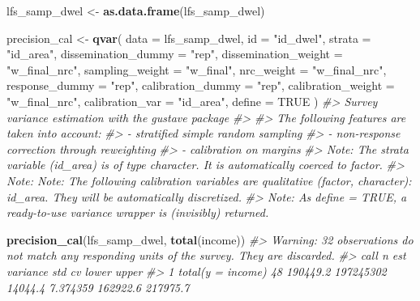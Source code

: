 \documentclass[
]{article}
\newenvironment{Shaded}{\begin{snugshade}}{\end{snugshade}}
\newcommand{\AttributeTok}[1]{\textcolor[rgb]{0.13,0.29,0.53}{#1}}
\newcommand{\CommentTok}[1]{\textcolor[rgb]{0.56,0.35,0.01}{\textit{#1}}}
\newcommand{\ConstantTok}[1]{\textcolor[rgb]{0.56,0.35,0.01}{#1}}
\newcommand{\FunctionTok}[1]{\textcolor[rgb]{0.13,0.29,0.53}{\textbf{#1}}}
\newcommand{\NormalTok}[1]{#1}
\newcommand{\OtherTok}[1]{\textcolor[rgb]{0.56,0.35,0.01}{#1}}
\newcommand{\StringTok}[1]{\textcolor[rgb]{0.31,0.60,0.02}{#1}}
\begin{document}
\begin{Shaded}
\begin{Highlighting}[]
\NormalTok{lfs\_samp\_dwel }\OtherTok{\textless{}{-}} \FunctionTok{as.data.frame}\NormalTok{(lfs\_samp\_dwel)}

\NormalTok{precision\_cal }\OtherTok{\textless{}{-}} \FunctionTok{qvar}\NormalTok{(}
  \AttributeTok{data                 =}\NormalTok{ lfs\_samp\_dwel,}
  \AttributeTok{id                   =} \StringTok{"id\_dwel"}\NormalTok{,}
  \AttributeTok{strata               =} \StringTok{"id\_area"}\NormalTok{,}
  \AttributeTok{dissemination\_dummy  =} \StringTok{"rep"}\NormalTok{,}
  \AttributeTok{dissemination\_weight =} \StringTok{"w\_final\_nrc"}\NormalTok{,}
  \AttributeTok{sampling\_weight      =} \StringTok{"w\_final"}\NormalTok{,}
  \AttributeTok{nrc\_weight           =} \StringTok{"w\_final\_nrc"}\NormalTok{,}
  \AttributeTok{response\_dummy       =} \StringTok{"rep"}\NormalTok{,}
  \AttributeTok{calibration\_dummy    =} \StringTok{"rep"}\NormalTok{,}
  \AttributeTok{calibration\_weight   =} \StringTok{"w\_final\_nrc"}\NormalTok{,}
  \AttributeTok{calibration\_var      =} \StringTok{"id\_area"}\NormalTok{,}
  \AttributeTok{define =} \ConstantTok{TRUE}
\NormalTok{)}
\CommentTok{\#\textgreater{} Survey variance estimation with the gustave package}
\CommentTok{\#\textgreater{} }
\CommentTok{\#\textgreater{} The following features are taken into account:}
\CommentTok{\#\textgreater{}   {-} stratified simple random sampling}
\CommentTok{\#\textgreater{}   {-} non{-}response correction through reweighting}
\CommentTok{\#\textgreater{}   {-} calibration on margins}
\CommentTok{\#\textgreater{} Note: The strata variable (id\_area) is of type character. It is automatically coerced to factor.}
\CommentTok{\#\textgreater{} Note: Note: The following calibration variables are qualitative (factor, character): id\_area. They will be automatically discretized.}
\CommentTok{\#\textgreater{} Note: As define = TRUE, a ready{-}to{-}use variance wrapper is (invisibly) returned.}

\FunctionTok{precision\_cal}\NormalTok{(lfs\_samp\_dwel, }\FunctionTok{total}\NormalTok{(income))}
\CommentTok{\#\textgreater{} Warning: 32 observations do not match any responding units of the survey. They are discarded.}
\CommentTok{\#\textgreater{}                call  n      est  variance     std       cv    lower    upper}
\CommentTok{\#\textgreater{} 1 total(y = income) 48 190449.2 197245302 14044.4 7.374359 162922.6 217975.7}
\end{Highlighting}
\end{Shaded}
\end{document}
